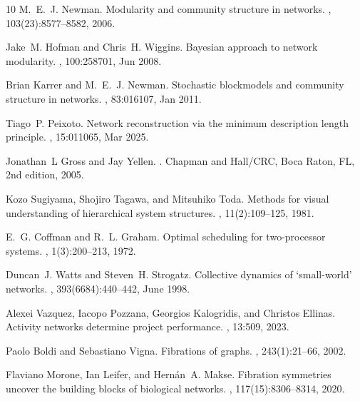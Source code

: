 \documentclass[11pt,a4paper]{article}
\begin{document}
\begin{thebibliography}{10}
M.~E.~J. Newman.
\newblock Modularity and community structure in networks.
,
  103(23):8577--8582, 2006.

Jake~M. Hofman and Chris~H. Wiggins.
\newblock Bayesian approach to network modularity.
, 100:258701, Jun 2008.

Brian Karrer and M.~E.~J. Newman.
\newblock Stochastic blockmodels and community structure in networks.
, 83:016107, Jan 2011.

Tiago~P. Peixoto.
\newblock Network reconstruction via the minimum description length principle.
, 15:011065, Mar 2025.

Jonathan~L Gross and Jay Yellen.
.
\newblock Chapman and Hall/CRC, Boca Raton, FL, 2nd edition, 2005.

Kozo Sugiyama, Shojiro Tagawa, and Mitsuhiko Toda.
\newblock Methods for visual understanding of hierarchical system structures.
,
  11(2):109--125, 1981.

E.~G. Coffman and R.~L. Graham.
\newblock Optimal scheduling for two-processor systems.
, 1(3):200--213, 1972.

Duncan~J. Watts and Steven~H. Strogatz.
\newblock Collective dynamics of ‘small-world’ networks.
, 393(6684):440--442, June 1998.

Alexei Vazquez, Iacopo Pozzana, Georgios Kalogridis, and Christos Ellinas.
\newblock Activity networks determine project performance.
, 13:509, 2023.

Paolo Boldi and Sebastiano Vigna.
\newblock Fibrations of graphs.
, 243(1):21--66, 2002.

Flaviano Morone, Ian Leifer, and Hernán~A. Makse.
\newblock Fibration symmetries uncover the building blocks of biological
  networks.
,
  117(15):8306--8314, 2020.

\end{thebibliography}
\end{document}
